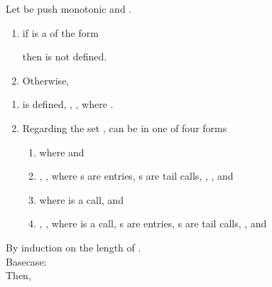 \documentclass{LMCS}
\theoremstyle{definition} \newtheorem{property}[thm]{Property}
\begin{document}
\begin{lem}\label{lem:decomp} 
  Let  be push monotonic and
  .
  \begin{enumerate}[]
  \item if \astat{} is a \dacapply{} of the form
    
    then \coren{\astat} is not defined.
  \item Otherwise,
  \end{enumerate}
    \begin{enumerate}[\quad\em(1)]
    \item\label{lem:decomp,case:coren}
      \coren{\astat} is defined, \ie{},
      ,
      where .
    \item\label{lem:decomp,case:corens}
      Regarding the set \corens{\astat},  can be in one of four forms
      \begin{enumerate}[\em(a)]
      \item\label{lem:decomp,case:corens1}
         
        where  and 
      \item\label{lem:decomp,case:corens2}
        , ,
        where s are entries, s are tail calls,
        , , 
        and 
      \item\label{lem:decomp,case:corens3}
         
        where  is a call, 
        and 
      \item\label{lem:decomp,case:corens4}
        , ,
        where  is a call, s are entries, s are tail calls,
        , 
        and 
      \end{enumerate}
    \end{enumerate}
\end{lem}
\proof
By induction on the length of . \\
Basecase:  \\
Then, 
\end{document}
